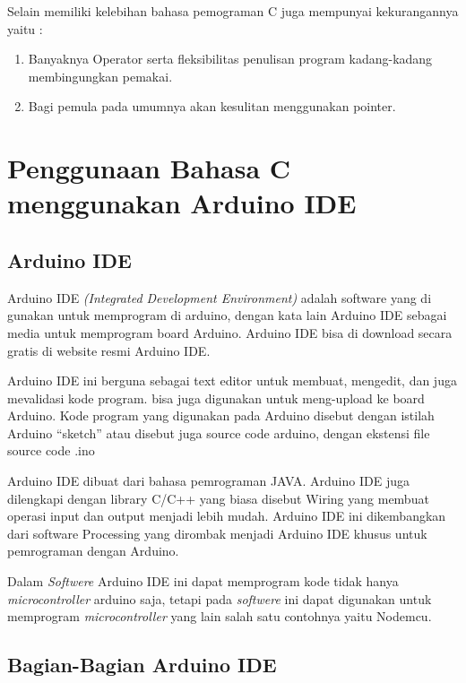 Selain memiliki kelebihan bahasa pemograman C juga mempunyai kekurangannya yaitu :
\begin{enumerate}
    \item Banyaknya Operator serta fleksibilitas penulisan program kadang-kadang membingungkan pemakai. 
    \item Bagi pemula pada umumnya akan kesulitan menggunakan pointer.
\end{enumerate}

\section{Penggunaan Bahasa C menggunakan Arduino IDE}
\subsection{Arduino IDE}
Arduino IDE \textit{(Integrated Development Environment)} adalah software yang di gunakan untuk memprogram di arduino, dengan kata lain Arduino IDE sebagai media untuk memprogram board Arduino. Arduino IDE bisa di download secara gratis di website resmi Arduino IDE.

Arduino IDE ini berguna sebagai text editor  untuk membuat,  mengedit, dan juga mevalidasi kode program. bisa juga digunakan untuk meng-upload ke board Arduino.  Kode program yang digunakan pada Arduino disebut dengan istilah Arduino “sketch”  atau disebut juga source code arduino, dengan ekstensi file source code .ino

Arduino IDE dibuat dari bahasa pemrograman JAVA. Arduino IDE juga dilengkapi dengan library C/C++ yang biasa disebut Wiring yang membuat operasi input dan output menjadi lebih mudah. Arduino IDE ini dikembangkan dari software Processing yang dirombak menjadi Arduino IDE khusus untuk pemrograman dengan Arduino.

Dalam \textit{Softwere} Arduino IDE ini dapat memprogram kode tidak hanya \textit{microcontroller} arduino saja, tetapi pada \textit{softwere} ini dapat digunakan untuk memprogram \textit{microcontroller} yang lain salah satu contohnya yaitu Nodemcu.

\subsection{Bagian-Bagian Arduino IDE}

